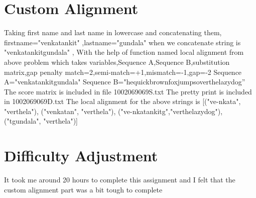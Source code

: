 \documentclass{article}
\begin{document}
\section{Custom Alignment}
Taking first name and last name in lowercase and concatenating them, firstname="venkatankit" ,lastname="gundala"
\newline when we concatenate string is "venkatankitgundala" ,\newline
With the help of function named local alignment from above problem which takes variables,Sequence A,Sequence B,substitution matrix,gap penalty\newline
match=2,semi-match=+1,mismatch=-1,gap=-2
Sequence A="venkatankitgundala" Sequence B="hequickbrownfoxjumpsoverthelazydog”\newline
\newline The score matrix is included in file 1002069069\textunderscore S.txt \newline
\newline The pretty print is included in 1002069069\textunderscore D.txt \newline
\newline The local alignment for the above strings is [("ve-nkata", "verthela"), ("venkatan", "verthela"), ("ve-nkatankitg","verthelazydog"), ("tgundala", "verthela")]

\section{Difficulty Adjustment}
It took me around 20 hours to complete this assignment and I felt that the custom alignment part was a bit tough to complete
\end{document}
